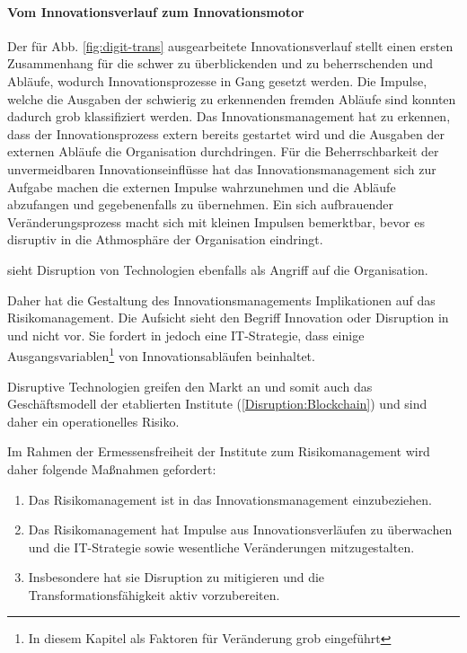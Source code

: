  \paragraph{Vom Innovationsverlauf zum Innovationsmotor}
Der für Abb. \ref{fig:digit-trans} ausgearbeitete Innovationsverlauf stellt einen ersten Zusammenhang für die schwer zu überblickenden und zu beherrschenden und Abläufe, wodurch Innovationsprozesse in Gang gesetzt werden. Die Impulse, welche die Ausgaben der schwierig zu erkennenden fremden Abläufe sind konnten dadurch grob klassifiziert werden. Das Innovationsmanagement hat zu erkennen, dass der Innovationsprozess extern bereits gestartet wird und die Ausgaben der externen Abläufe die Organisation durchdringen. Für die Beherrschbarkeit der unvermeidbaren Innovationseinflüsse hat das Innovationsmanagement sich zur Aufgabe machen die externen Impulse wahrzunehmen und die Abläufe abzufangen und gegebenenfalls zu übernehmen. Ein sich aufbrauender Veränderungsprozess macht sich mit kleinen Impulsen bemerktbar, bevor es disruptiv in die Athmosphäre der Organisation eindringt.

\citet{Fernandez:2020} sieht Disruption von Technologien ebenfalls als Angriff auf die Organisation.

Daher hat die Gestaltung des Innovationsmanagements Implikationen auf das Risikomanagement. Die Aufsicht sieht den Begriff Innovation oder Disruption in \cite{MaRisk:2017} und \cite{BAIT:2018} nicht vor. Sie fordert in \cite{BAIT:2018} jedoch eine IT-Strategie, dass einige Ausgangsvariablen\footnote{In diesem Kapitel als Faktoren für Veränderung grob eingeführt} von Innovationsabläufen beinhaltet. 

Disruptive Technologien greifen den Markt an \cite{Fernandez:2020} und somit auch das Geschäftsmodell der etablierten Institute (\ref{Disruption:Blockchain}) und sind daher ein operationelles Risiko.

Im Rahmen der Ermessensfreiheit der Institute zum Risikomanagement wird daher folgende Maßnahmen gefordert:
\begin{enumerate}
    \item Das Risikomanagement ist in das Innovationsmanagement einzubeziehen. 
    \item Das Risikomanagement hat Impulse aus Innovationsverläufen zu überwachen und die IT-Strategie sowie wesentliche Veränderungen mitzugestalten. 
    \item Insbesondere hat sie Disruption zu mitigieren und die Transformationsfähigkeit aktiv vorzubereiten.
\end{enumerate}